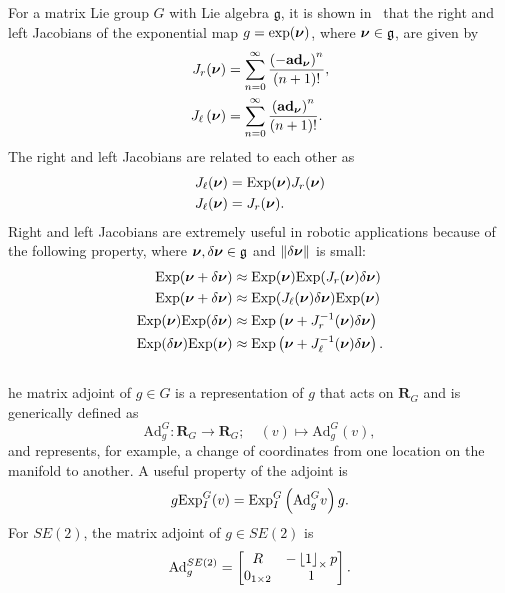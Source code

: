 For a matrix Lie group $G$ with Lie algebra $\mathfrak{g}$, it is shown in~\cite{Barfoot2019} that the right and left Jacobians of the exponential map $g=\exp(\nubf)$, where $\nubf \in \mathfrak{g}$, are given by 
\begin{align} 
J_{r}(\nubf) & =\sum_{n=0}^{\infty}\frac{\left(-\mathbf{ad}_{\nubf}\right)^{n}}{\left(n+1\right)!}, 
\label{eq:exponential_right_jacobians}
\\
J_{\ell}\left(\nubf\right) & =\sum_{n=0}^{\infty}\frac{\left(\mathbf{ad}_{\nubf}\right)^{n}}{\left(n+1\right)!}.
\label{eq:exponential_left_jacobians}
\end{align}
The right and left Jacobians are related to each other as
\begin{align*}
J_\ell(\nubf) &= \Exp(\nubf) J_r(\nubf) \\
J_\ell(\nubf) &= J_r(\nubf).
\end{align*}
Right and left Jacobians are extremely useful in robotic applications because of the following property, where $\nubf, \delta\nubf\in\mathfrak{g}$ and $\norm{\delta\nubf}$ is small:
\begin{subequations}\label{eq:Jacobian_property}
\begin{align}
\Exp(\nubf + \delta\nubf) &\approx \Exp(\nubf)\Exp(J_r(\nubf)\delta\nubf) \\
\Exp(\nubf + \delta\nubf) &\approx \Exp(J_\ell(\nubf)\delta\nubf)\Exp(\nubf) \\
\Exp(\nubf)\Exp(\delta\nubf) & \approx\Exp\left(\nubf+J_{r}^{-1}(\nubf)\delta\nubf\right) \\
\Exp(\delta\nubf)\Exp(\nubf) & \approx\Exp\left(\nubf+J_{\ell}^{-1}(\nubf)\delta\nubf\right).
\end{align}
\end{subequations}



\subsection{}
he matrix adjoint of $g\in G$ is a representation of $g$ that acts on $\mathbf{R}_G$ and is generically defined as 
\[
\text{Ad}^G_{g}:\mathbf{R}_G\to\mathbf{R}_G;\quad\left(v\right)\mapsto \text{Ad}^{G}_{g}(v),
\]
and represents, for example, a change of coordinates from one location on the manifold to another.
A useful property of the adjoint is 
\begin{equation}\label{eq:lie_groups_review_adjoint_relation}
g\Exp_I^{G}(v)=\Exp_I^{G}\left(\text{Ad}^G_g v\right)g.    
\end{equation}
%
For $SE(2)$, the matrix adjoint of $g \in SE(2)$ is
%
\begin{equation}
    \text{Ad}^{SE(2)}_g = \begin{bmatrix}
    R & -\ss{1} p\\
    0_{1\times 2} &1
    \end{bmatrix}.
\end{equation}

